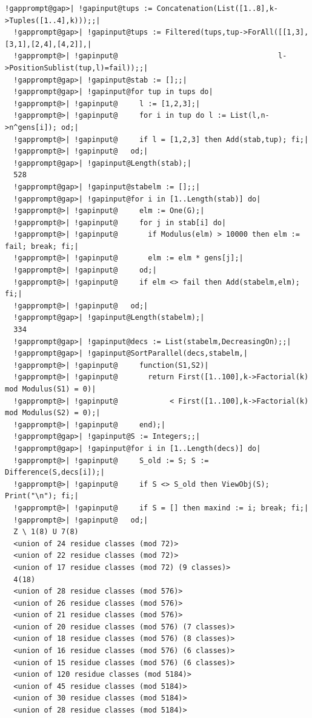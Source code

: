 \documentclass[a4paper,11pt]{report}
\begin{document}
{{\begin{Verbatim}[commandchars=!@|,fontsize=\small,frame=single,label=Example]
  !gapprompt@gap>| !gapinput@tups := Concatenation(List([1..8],k->Tuples([1..4],k)));;|
  !gapprompt@gap>| !gapinput@tups := Filtered(tups,tup->ForAll([[1,3],[3,1],[2,4],[4,2]],|
  !gapprompt@>| !gapinput@                                     l->PositionSublist(tup,l)=fail));;|
  !gapprompt@gap>| !gapinput@stab := [];;|
  !gapprompt@gap>| !gapinput@for tup in tups do|
  !gapprompt@>| !gapinput@     l := [1,2,3];|
  !gapprompt@>| !gapinput@     for i in tup do l := List(l,n->n^gens[i]); od;|
  !gapprompt@>| !gapinput@     if l = [1,2,3] then Add(stab,tup); fi;|
  !gapprompt@>| !gapinput@   od;|
  !gapprompt@gap>| !gapinput@Length(stab);|
  528
  !gapprompt@gap>| !gapinput@stabelm := [];;|
  !gapprompt@gap>| !gapinput@for i in [1..Length(stab)] do|
  !gapprompt@>| !gapinput@     elm := One(G);|
  !gapprompt@>| !gapinput@     for j in stab[i] do|
  !gapprompt@>| !gapinput@       if Modulus(elm) > 10000 then elm := fail; break; fi;|
  !gapprompt@>| !gapinput@       elm := elm * gens[j];|
  !gapprompt@>| !gapinput@     od;|
  !gapprompt@>| !gapinput@     if elm <> fail then Add(stabelm,elm); fi;|
  !gapprompt@>| !gapinput@   od;|
  !gapprompt@gap>| !gapinput@Length(stabelm);|
  334
  !gapprompt@gap>| !gapinput@decs := List(stabelm,DecreasingOn);;|
  !gapprompt@gap>| !gapinput@SortParallel(decs,stabelm,|
  !gapprompt@>| !gapinput@     function(S1,S2)|
  !gapprompt@>| !gapinput@       return First([1..100],k->Factorial(k) mod Modulus(S1) = 0)|
  !gapprompt@>| !gapinput@            < First([1..100],k->Factorial(k) mod Modulus(S2) = 0);|
  !gapprompt@>| !gapinput@     end);|
  !gapprompt@gap>| !gapinput@S := Integers;;|
  !gapprompt@gap>| !gapinput@for i in [1..Length(decs)] do|
  !gapprompt@>| !gapinput@     S_old := S; S := Difference(S,decs[i]);|
  !gapprompt@>| !gapinput@     if S <> S_old then ViewObj(S); Print("\n"); fi;|
  !gapprompt@>| !gapinput@     if S = [] then maxind := i; break; fi;|
  !gapprompt@>| !gapinput@   od;|
  Z \ 1(8) U 7(8)
  <union of 24 residue classes (mod 72)>
  <union of 22 residue classes (mod 72)>
  <union of 17 residue classes (mod 72) (9 classes)>
  4(18)
  <union of 28 residue classes (mod 576)>
  <union of 26 residue classes (mod 576)>
  <union of 21 residue classes (mod 576)>
  <union of 20 residue classes (mod 576) (7 classes)>
  <union of 18 residue classes (mod 576) (8 classes)>
  <union of 16 residue classes (mod 576) (6 classes)>
  <union of 15 residue classes (mod 576) (6 classes)>
  <union of 120 residue classes (mod 5184)>
  <union of 45 residue classes (mod 5184)>
  <union of 30 residue classes (mod 5184)>
  <union of 28 residue classes (mod 5184)>

\end{Verbatim}}}
\end{document}

